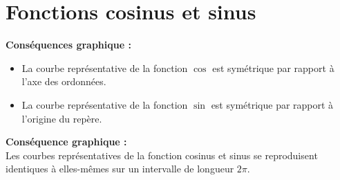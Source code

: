 \documentclass[10pt]{article}
\begin{document}
\newpage

\section{Fonctions cosinus et sinus}




\textbf{Conséquences graphique :}
\begin{itemize}
    \item La courbe représentative de la fonction $\cos$ est symétrique par rapport à l'axe des ordonnées.
    \item La courbe représentative de la fonction $\sin$ est symétrique par rapport à l'origine du repère.
\end{itemize}



\textbf{Conséquence graphique :} ~\\
Les courbes représentatives de la fonction cosinus et sinus se reproduisent identiques à elles-mêmes sur un intervalle de longueur $2\pi$.
\end{document}
